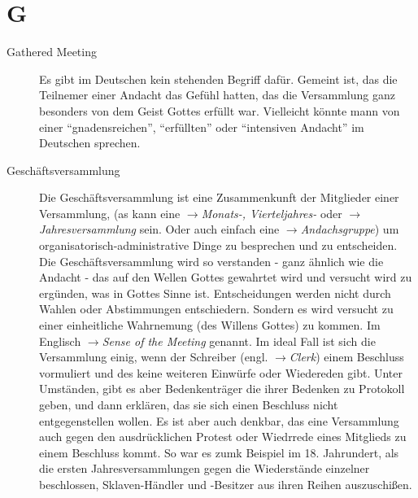 \section*{G}

\articlesize

\begin{description}

\item[Gathered Meeting] Es gibt im Deutschen kein stehenden Begriff dafür.
Gemeint ist, das die Teilnemer einer Andacht das Gefühl hatten, das die
Versammlung ganz besonders von dem Geist Gottes erfüllt war. Vielleicht könnte
mann von einer "`gnadensreichen"', "`erfüllten"' oder "`intensiven Andacht"'
im Deutschen sprechen. 

 \item[Geschäftsversammlung] Die Geschäftsversammlung ist eine Zusammenkunft
 der Mitglieder einer Versammlung, (as kann eine $\to$\textit{Monats-,
 Vierteljahres-} oder $\to$\textit{Jahresversammlung} sein. Oder auch einfach
 eine $\to$\textit{Andachsgruppe}) um organisatorisch-administrative Dinge
 zu besprechen und zu entscheiden.
 \medskip
 Die Geschäftsversammlung wird so verstanden - ganz ähnlich wie die Andacht -
 das auf den Wellen Gottes gewahrtet wird und versucht wird zu ergünden, was
 in Gottes Sinne ist. Entscheidungen werden nicht durch Wahlen oder Abstimmungen
 entschiedern. Sondern es wird versucht zu einer einheitliche Wahrnemung (des
 Willens Gottes) zu kommen. Im Englisch $\to$\textit{Sense of the Meeting}
 genannt. Im ideal Fall ist sich die Versammlung einig, wenn der Schreiber
 (engl. $\to$\textit{Clerk}) einem Beschluss vormuliert und des keine weiteren
 Einwürfe oder Wiedereden gibt. Unter Umständen, gibt es aber Bedenkenträger
 die ihrer Bedenken zu Protokoll geben, und dann erklären, das sie sich einen
 Beschluss nicht entgegenstellen wollen. Es ist aber auch denkbar, das eine
 Versammlung auch gegen den ausdrücklichen Protest oder Wiedrrede eines
 Mitglieds zu einem Beschluss kommt. So war es zumk Beispiel im 18. Jahrundert,
 als die ersten Jahresversammlungen gegen die Wiederstände einzelner beschlossen,
 Sklaven-Händler und -Besitzer aus ihren Reihen auszuschißen. 


\end{description}
